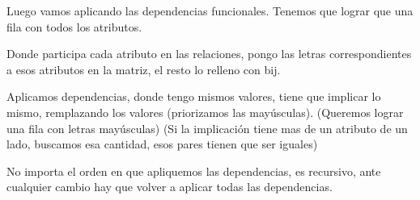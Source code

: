 \medskip
Luego vamos aplicando las dependencias funcionales. 
Tenemos que lograr que una fila con todos los atributos.

\medskip
Donde participa cada atributo en las relaciones, pongo las letras correspondientes a esos atributos en la matriz, el resto lo relleno con bij.

\medskip
Aplicamos dependencias, donde tengo mismos valores, tiene que implicar lo mismo, remplazando los valores (priorizamos las mayúsculas). (Queremos lograr una fila con letras mayúsculas) (Si la implicación tiene mas de un atributo de un lado, buscamos esa cantidad, esos pares tienen que ser iguales)

\medskip
No importa el orden en que apliquemos las dependencias, es recursivo, ante cualquier cambio hay que volver a aplicar todas las dependencias. 


\newpage